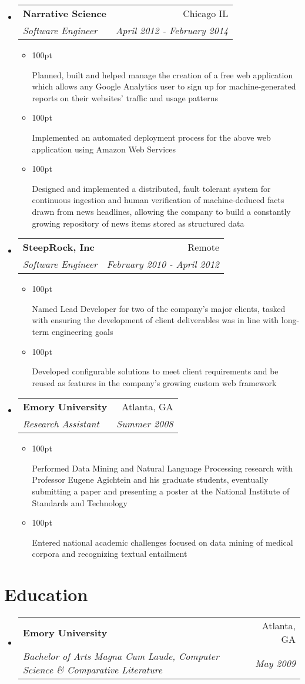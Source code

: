 \documentclass[letterpaper,10pt]{article}
\makeatletter
\newcommand{\resumeItem}[1]{
  \item{
    \begin{adjustwidth}{}{100pt}
    #1
    \end{adjustwidth}
  }
}
\newcommand{\resumeSubheading}[4]{
  \vspace{-1pt}\item[]
    \begin{tabular*}{0.97\textwidth}{l@{\extracolsep{\fill}}r}
      \textbf{#1} & #2 \\
      \textit{#3} & \textit{#4} \\
    \end{tabular*}\vspace{-5pt}
}
\makeatother
\begin{document}
\begin{itemize}[leftmargin=*]
    \resumeSubheading
      {Narrative Science}
      {Chicago IL}
      {Software Engineer}
      {April 2012 - February 2014}
    \begin{itemize}
      \resumeItem{
        Planned, built and helped manage the creation of a
        free web application which allows any Google Analytics
        user to sign up for machine-generated reports on their
        websites' traffic and usage patterns
      }
      \resumeItem{
        Implemented an automated deployment process for the
        above web application using Amazon Web Services
      }
      \resumeItem{
        Designed and implemented a distributed, fault tolerant
        system for continuous ingestion and human verification of
        machine-deduced facts drawn from news headlines, allowing
        the company to build a constantly growing repository of news
        items stored as structured data
      }
    \end{itemize}

    \resumeSubheading
      {SteepRock, Inc}
      {Remote}
      {Software Engineer}
      {February 2010 - April 2012}
    \begin{itemize}
      \resumeItem{
        Named Lead Developer for two of the company's major
        clients, tasked with ensuring the development of client
        deliverables was in line with long-term engineering goals
      }
      \resumeItem{
        Developed configurable solutions to meet client
        requirements and be reused as features in the company's
        growing custom web framework
      }
    \end{itemize}

    \resumeSubheading
      {Emory University}
      {Atlanta, GA}
      {Research Assistant}
      {Summer 2008}
    \begin{itemize}
      \resumeItem{
        Performed Data Mining and Natural Language Processing research
        with Professor Eugene Agichtein and his graduate students,
        eventually submitting a paper and presenting a poster at the National
        Institute of Standards and Technology
      }
      \resumeItem{
        Entered national academic challenges focused on data
        mining of medical corpora and recognizing textual entailment
      }
    \end{itemize}

  \end{itemize}

\section{Education}
  \begin{itemize}[leftmargin=*]
    \resumeSubheading
        {Emory University}
        {Atlanta, GA}
        {Bachelor of Arts Magna Cum Laude, Computer Science \& Comparative Literature}
        {May 2009}
  \end{itemize}
\end{document}
